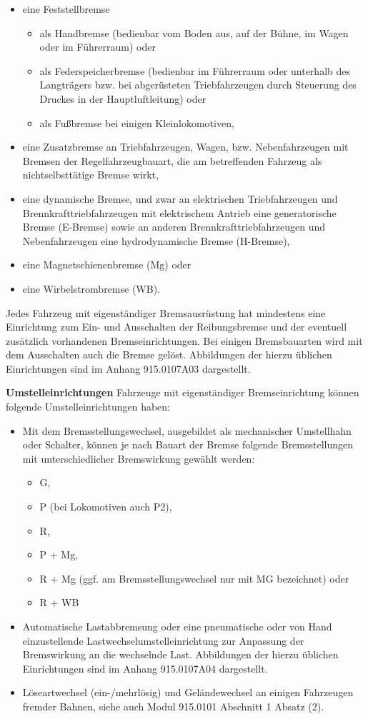 \begin{itemize}
    \item eine Feststellbremse
    \begin{itemize}
        \item als Handbremse (bedienbar vom Boden aus, auf der Bühne, im Wagen oder im Führerraum) oder
        \item als Federspeicherbremse (bedienbar im Führerraum oder unterhalb des Langträgers bzw. bei abgerüsteten Triebfahrzeugen durch Steuerung des Druckes in der Hauptluftleitung) oder
        \item als Fußbremse bei einigen Kleinlokomotiven,
    \end{itemize}
    \item eine Zusatzbremse an Triebfahrzeugen, Wagen, bzw. Nebenfahrzeugen mit Bremsen der Regelfahrzeugbauart, die am betreffenden Fahrzeug als nichtselbsttätige Bremse wirkt,
    \item eine dynamische Bremse, und zwar an elektrischen Triebfahrzeugen und Brennkrafttriebfahrzeugen mit elektrischem Antrieb eine generatorische Bremse (E-Bremse) sowie an anderen Brennkrafttriebfahrzeugen und Nebenfahrzeugen eine hydrodynamische Bremse (H-Bremse),
    \item eine Magnetschienenbremse (Mg) oder
    \item eine Wirbelstrombremse (WB).
\end{itemize}
Jedes Fahrzeug mit eigenständiger Bremsausrüstung hat mindestens eine Einrichtung zum Ein- und Ausschalten der Reibungsbremse und der eventuell zusätzlich vorhandenen Bremseinrichtungen. Bei einigen Bremsbauarten wird mit dem Ausschalten auch die Bremse gelöst. Abbildungen der hierzu üblichen Einrichtungen sind im Anhang 915.0107A03 dargestellt.\par
\textbf{Umstelleinrichtungen}
Fahrzeuge mit eigenständiger Bremseinrichtung können folgende Umstelleinrichtungen haben:
\begin{itemize}
    \item Mit dem Bremsstellungswechsel, ausgebildet als mechanischer Umstellhahn oder Schalter, können je nach Bauart der Bremse folgende Bremsstellungen mit unterschiedlicher Bremswirkung gewählt werden:
    \begin{itemize}
        \item G,
        \item P (bei Lokomotiven auch P2),
        \item R,
        \item P + Mg,
        \item R + Mg (ggf. am Bremsstellungswechsel nur mit MG bezeichnet) oder
        \item R + WB
    \end{itemize}
    \item  Automatische Lastabbremsung oder eine pneumatische oder von Hand einzustellende Lastwechselumstelleinrichtung zur Anpassung der Bremswirkung an die wechselnde Last. Abbildungen der hierzu üblichen Einrichtungen sind im Anhang 915.0107A04 dargestellt.
    \item Löseartwechsel (ein-/mehrlösig) und Geländewechsel an einigen Fahrzeugen fremder Bahnen, siehe auch Modul 915.0101 Abschnitt 1 Absatz (2).
\end{itemize}
